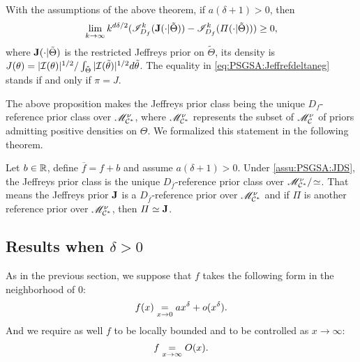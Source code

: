 \begin{prop}
    With the assumptions of the above theorem,  if $a(\delta+1)>0$, then
        \begin{equation}\label{eq:PSGSA:Jeffrefdeltaneg}
            \lim_{k\rightarrow\infty}k^{d\delta/2}(\mathscr{I}^k_{D_f}(\mathbf{J}(\cdot|\tilde\Theta))-\mathscr{I}_{D_f}^k(\varPi(\cdot|\tilde\Theta)))\geq 0 ,
        \end{equation}
    where $\mathbf{J}(\cdot|\tilde\Theta)$ is the restricted Jeffreys prior on $\tilde\Theta$, its density is $J(\theta)=|\mathcal{I}(\theta)|^{1/2}/\int_{\tilde\Theta}|\mathcal{I}(\tilde\theta)|^{1/2}d\tilde\theta$.
    The equality in \cref{eq:PSGSA:Jeffrefdeltaneg} stands if and only if 
    {$\pi=J$}.
\end{prop}


The above proposition makes the Jeffreys prior class being the unique $D_f$-reference prior class over $\mathscr{M}^\nu_{\mathcal{C}^\ast}$, where $\mathscr{M}^\nu_{\mathcal{C}^\ast}$ represents the subset of $\mathscr{M}_{\mathcal{C}}^\nu$ of priors admitting positive densities on $\Theta$. We
 formalized this statement in the following theorem.



\begin{thm}\label{thm:PSGSA:Jrefdeltaneg}
    Let $b\in\mathbb{R}$, define $\overline{f}=f+b$ and assume $a(\delta+1)>0$.
    Under \cref{assu:PSGSA:JDS}, the Jeffreys prior class is the unique $D_{\overline f}$-reference prior class over $\mathscr{M}^\nu_{\mathcal{C}^\ast}/\!\simeq$.
    That means the Jeffreys prior $\mathbf{J}$ is a $D_{\overline f}$-reference prior over $\mathscr{M}^\nu_{\mathcal{C}^\ast}$ and if $\varPi$ is another reference prior over $\mathscr{M}^\nu_{\mathcal{C}^\ast}$, then $\varPi\simeq\mathbf{J}$.
\end{thm}



\subsection{Results when $\delta>0$}


As in the previous section, we suppose that $f$ takes the following form in the neighborhood of $0$:
\begin{equation}
    f(x) \overset{}{\underset{x\rightarrow0}{=}} a x^\delta + o(x^\delta).
\end{equation}
And we require as well $f$ to be locally bounded and to be controlled as $x\to\infty$: 
\begin{equation}
f\overset{}{\underset{x\rightarrow\infty}{=}}O(x).
\end{equation}

